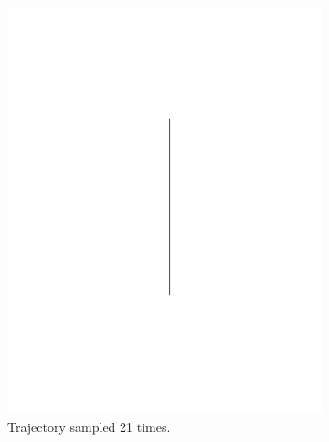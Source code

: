 \begin{figure}[!t]
  \begin{subfigure}[b]{0.5\textwidth}
    \includegraphics[trim={5cm 5cm 5cm 5cm},
    width=.95\textwidth]{figures/method/trajectory-sampled}
    \caption{Trajectory sampled 21 times.\newline}
  \end{subfigure}%
  \begin{subfigure}[b]{0.5\textwidth}

\end{subfigure}
\end{figure}
